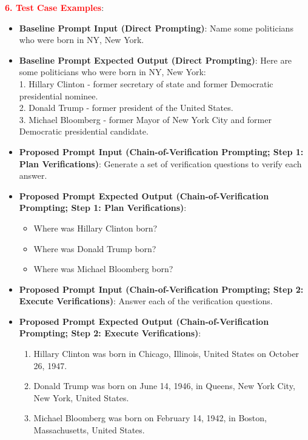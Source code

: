 \textbf{\textcolor{red}{6. Test Case Examples}}: \\
\begin{itemize}[topsep=0pt, itemsep=0pt]
    \item \textbf{Baseline Prompt Input (Direct Prompting)}: Name some politicians who were born in NY, New York.
    \item \textbf{Baseline Prompt Expected Output (Direct Prompting)}: Here are some politicians who were born in NY, New York: \\
        1. Hillary Clinton - former secretary of state and former Democratic presidential nominee. \\
        2. Donald Trump - former president of the United States. \\
        3. Michael Bloomberg - former Mayor of New York City and former Democratic presidential candidate.
    \item \textbf{Proposed Prompt Input (Chain-of-Verification Prompting; Step 1: Plan Verifications)}: Generate a set of verification questions to verify each answer.
    \item \textbf{Proposed Prompt Expected Output (Chain-of-Verification Prompting; Step 1: Plan Verifications)}: 
        \begin{itemize}[topsep=0pt, itemsep=0pt]
            \item Where was Hillary Clinton born?
            \item Where was Donald Trump born?
            \item Where was Michael Bloomberg born?
        \end{itemize}
    \item \textbf{Proposed Prompt Input (Chain-of-Verification Prompting; Step 2: Execute Verifications)}: Answer each of the verification questions.
    \item \textbf{Proposed Prompt Expected Output (Chain-of-Verification Prompting; Step 2: Execute Verifications)}: 
        \begin{enumerate}[label=\arabic*., topsep=0pt, itemsep=0pt]
            \item Hillary Clinton was born in Chicago, Illinois, United States on October 26, 1947.
            \item Donald Trump was born on June 14, 1946, in Queens, New York City, New York, United States.
            \item Michael Bloomberg was born on February 14, 1942, in Boston, Massachusetts, United States.
        \end{enumerate}

\end{itemize}
